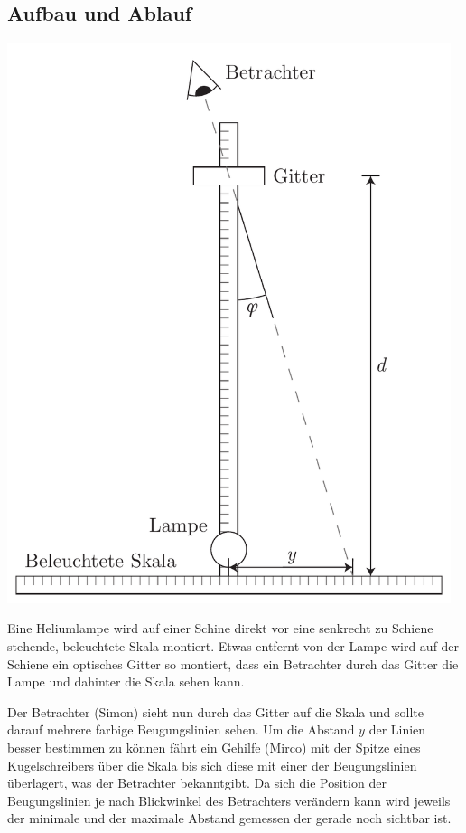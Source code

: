 \documentclass[12pt,a4paper]{article}
\begin{document}
\subsection*{Aufbau und Ablauf}
\begin{center}
\includegraphics[width=13cm]{illustration.pdf}
\end{center}

Eine Heliumlampe wird auf einer Schine direkt vor eine senkrecht zu Schiene stehende, beleuchtete Skala montiert. Etwas entfernt von der Lampe wird auf der Schiene ein optisches Gitter so montiert, dass ein Betrachter durch das Gitter die Lampe und dahinter die Skala sehen kann.

Der Betrachter (Simon) sieht nun durch das Gitter auf die Skala und sollte darauf mehrere farbige Beugungslinien sehen. Um die Abstand $y$ der Linien besser bestimmen zu k\"onnen f\"ahrt ein Gehilfe (Mirco) mit der Spitze eines Kugelschreibers \"uber die Skala bis sich diese mit einer der Beugungslinien \"uberlagert, was der Betrachter bekanntgibt. Da sich die Position der Beugungslinien je nach Blickwinkel des Betrachters ver\"andern kann wird jeweils der minimale und der maximale Abstand gemessen der gerade noch sichtbar ist.
\end{document}
